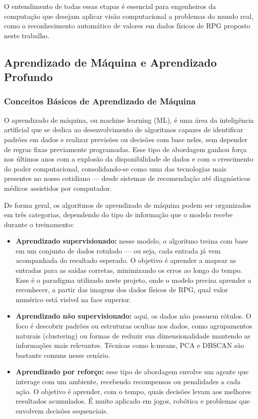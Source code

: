 O entendimento de todas essas etapas é essencial para engenheiros da computação que desejam aplicar visão computacional 
a problemas do mundo real, como o reconhecimento automático de valores em dados físicos de RPG proposto neste trabalho.

\subsection{Aprendizado de Máquina e Aprendizado Profundo}

\subsubsection{Conceitos Básicos de Aprendizado de Máquina}

O aprendizado de máquina, ou machine learning (ML), é uma área da inteligência artificial que se dedica ao desenvolvimento de algoritmos 
capazes de identificar padrões em dados e realizar previsões ou decisões com base neles, sem depender de regras fixas previamente 
programadas. Esse tipo de abordagem ganhou força nos últimos anos com a explosão da disponibilidade de dados e com o crescimento 
do poder computacional, consolidando-se como uma das tecnologias mais presentes no nosso cotidiano — desde sistemas de recomendação 
até diagnósticos médicos assistidos por computador. \cite{bishop2006pattern, goodfellow2016deep}

De forma geral, os algoritmos de aprendizado de máquina podem ser organizados em três categorias, dependendo do tipo de informação 
que o modelo recebe durante o treinamento:

\begin{itemize}
    \item \textbf{Aprendizado supervisionado:}  nesse modelo, o algoritmo treina com base em um conjunto de dados rotulado — ou seja, 
    cada entrada já vem acompanhada do resultado esperado. O objetivo é aprender a mapear as entradas para as saídas corretas, 
    minimizando os erros ao longo do tempo. Esse é o paradigma utilizado neste projeto, onde o modelo precisa aprender a reconhecer, 
    a partir das imagens dos dados físicos de RPG, qual valor numérico está visível na face superior.

    \item \textbf{Aprendizado não supervisionado:}  aqui, os dados não possuem rótulos. O foco é descobrir padrões ou estruturas ocultas 
    nos dados, como agrupamentos naturais (clustering) ou formas de reduzir sua dimensionalidade mantendo as informações mais relevantes. 
    Técnicas como k-means, PCA e DBSCAN são bastante comuns nesse cenário. \cite{bishop2006pattern}

    \item \textbf{Aprendizado por reforço:} esse tipo de abordagem envolve um agente que interage com um ambiente, recebendo recompensas ou 
    penalidades a cada ação. O objetivo é aprender, com o tempo, quais decisões levam aos melhores resultados acumulados. É muito aplicado 
    em jogos, robótica e problemas que envolvem decisões sequenciais. \cite{goodfellow2016deep}
\end{itemize}

